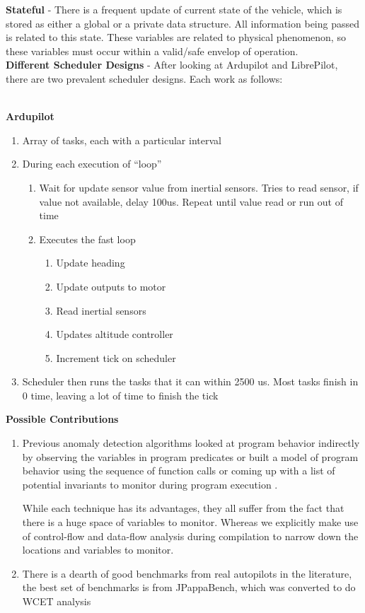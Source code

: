 \noindent \textbf{Stateful} - There is a frequent update of current state of the
vehicle, which is stored as either a global or a private
data structure. All information being passed is related to this
state. These variables are related to physical phenomenon, so these
variables must occur within a valid/safe envelop of operation.
~\\

\noindent \textbf{Different Scheduler Designs} - After looking at
Ardupilot and LibrePilot, there are two prevalent scheduler
designs. Each work as follows:

~\\
\noindent \textbf{Ardupilot}
\begin{enumerate}
\item Array of tasks, each with a particular interval
\item During each execution of “loop”
  \begin{enumerate}
    \item Wait for update sensor value from inertial
    sensors. Tries to read sensor, if value not available, delay
    100us. Repeat until value read or run out of time
    \item Executes the fast loop
    \begin{enumerate}
    \item Update heading
    \item Update outputs to motor
    \item Read inertial sensors
    \item Updates altitude controller
    \item Increment tick on scheduler
    \end{enumerate}
  \end{enumerate}
\item Scheduler then runs the tasks that it can within 2500 us.  Most
  tasks finish in 0 time, leaving a lot of time to finish the tick
\end{enumerate}

\noindent \textbf{Possible Contributions}

\begin{enumerate}
  \item Previous anomaly detection algorithms looked at program
    behavior indirectly by observing the variables in program
    predicates \cite{baah_2006} or built a model of program behavior
    using the sequence of function calls \cite{fei_argus_2006} or
    coming up with a list of potential invariants to monitor during
    program execution \cite{brun_finding_2004}.
    
    While each technique has its advantages, they all suffer from the
    fact that there is a huge
    space of variables to monitor. Whereas we explicitly
    make use of control-flow and data-flow analysis during compilation
    to narrow down the locations and variables to monitor.
  \item There is a dearth of good benchmarks from real autopilots in
    the literature, the best set of benchmarks is from JPappaBench,
    which was converted to do WCET analysis
\end{enumerate}

